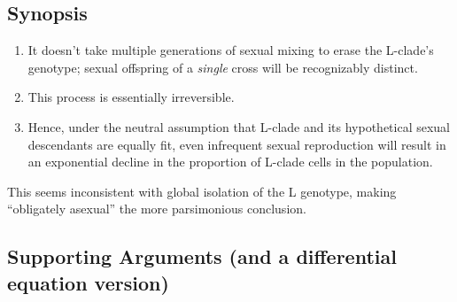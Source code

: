 \documentclass{article}\usepackage[]{graphicx}\usepackage[]{color}
\begin{document}
\subsection{Synopsis}

\begin{enumerate}
\item It doesn't take multiple generations of sexual mixing to erase the L-clade's genotype; sexual
  offspring of a \textit{single} cross will be recognizably distinct.
\item This process is essentially irreversible.
\item Hence, under the neutral assumption that L-clade and its hypothetical sexual descendants are
  equally fit, even infrequent sexual reproduction will result in an exponential decline in the
  proportion of L-clade cells in the population.
\end{enumerate}

This seems inconsistent with global isolation of the L genotype, making ``obligately asexual'' the
more parsimonious conclusion.

\subsection{Supporting Arguments (and a differential equation version)}
\end{document}
